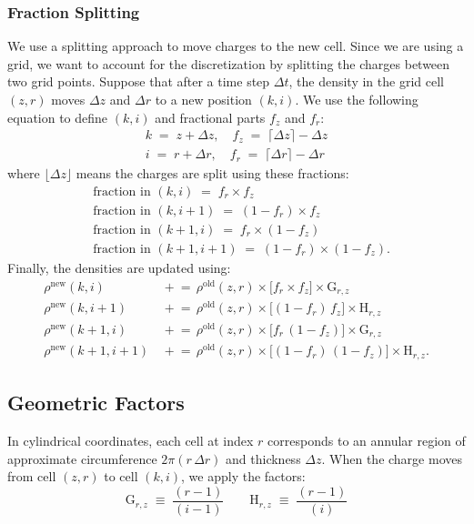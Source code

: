 \subsubsection*{Fraction Splitting}\label{ch3:sec:frac_split}
We use a splitting approach to move charges to the new cell. Since we are using a grid, we want to account for the discretization by splitting the charges between two grid points. Suppose that after a time step $\Delta t$, the density in the grid cell $(z,r)$ moves $\Delta z$ and $\Delta r$ to a new position $(k,i)$. We use the following equation to define $(k,i)$ and fractional parts $f_z$ and $f_r$:
\begin{align}
k \;=\; z + \Delta z,\quad
f_z \;=\; \lceil \Delta z \rceil - \Delta z\\
i \;=\; r + \Delta r ,\quad
f_r \;=\; \lceil \Delta r \rceil - \Delta r
\end{align}
where $\lfloor \Delta z \rfloor$ means the charges are split using these fractions:
\begin{align}
&\text{fraction in }(k, i)   \;=\; f_{r} \times f_{z} \\
&\text{fraction in }(k, i+1) \;=\; (1 - f_{r}) \times f_{z}\\
&\text{fraction in }(k+1, i) \;=\; f_{r} \times (1 - f_{z})\\
&\text{fraction in }(k+1, i+1)\;=\; (1 - f_{r}) \times (1 - f_{z}).
\label{eq:bilinear-fractions}
\end{align}
Finally, the densities are updated using:
\begin{align}
\rho^{\mathrm{new}}(k,i)   &\,\mathrel{+}=\, \rho^{\mathrm{old}}(z,r)\times \bigl[f_{r}\times f_{z}\bigr] \times \text{G}_{r,z} \label{ch3:eq:den_update_1} \\
\rho^{\mathrm{new}}(k,i+1) &\,\mathrel{+}=\, \rho^{\mathrm{old}}(z,r)\times \bigl[(1 - f_{r})\,f_{z}\bigr] \times \text{H}_{r,z} \label{ch3:eq:den_update_2} \\
\rho^{\mathrm{new}}(k+1,i) &\,\mathrel{+}=\, \rho^{\mathrm{old}}(z,r)\times \bigl[f_{r}\,(1 - f_{z})\bigr] \times \text{G}_{r,z} \label{ch3:eq:den_update_3} \\
\rho^{\mathrm{new}}(k+1,i+1)&\,\mathrel{+}=\, \rho^{\mathrm{old}}(z,r)\times \bigl[(1 - f_{r})\,(1 - f_{z})\bigr] \times \text{H}_{r,z}. \label{ch3:eq:den_update_4}
\end{align}


\subsection{Geometric Factors}
\label{sec:geom-factor}
In cylindrical coordinates, each cell at index $r$ corresponds to an annular region of approximate circumference $2\pi (r \,\Delta r)$ and thickness $\Delta z$. When the charge moves from cell $(z,r)$ to cell $(k,i)$, we apply the factors:
\[
\text{G}_{r,z} \;\equiv\; \frac{(r-1)}{(i-1)}
\qquad
\text{H}_{r,z} \;\equiv\; \frac{(r-1)}{(i)}
\] 

